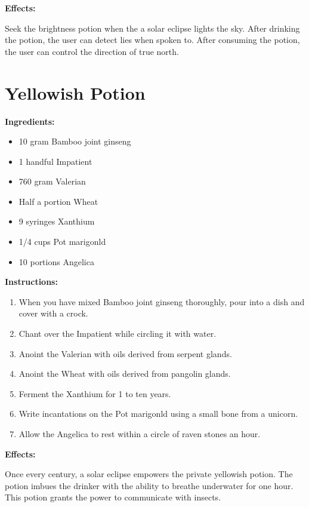 \documentclass{article}
\begin{document}
\textbf{Effects:}

Seek the brightness potion when the a solar eclipse lights the sky. After drinking the potion, the user can detect lies when spoken to. After consuming the potion, the user can control the direction of true north.

\newpage
\section*{Yellowish Potion}

\textbf{Ingredients:}

\begin{itemize}
  \item 10 gram Bamboo joint ginseng
  \item 1 handful Impatient
  \item 760 gram Valerian
  \item Half a portion Wheat
  \item 9 syringes Xanthium
  \item 1/4 cups Pot marigonld
  \item 10 portions Angelica
\end{itemize}

\textbf{Instructions:}

\begin{enumerate}
  \item When you have mixed Bamboo joint ginseng thoroughly, pour into a dish and cover with a crock.
  \item Chant over the Impatient while circling it with water.
  \item Anoint the Valerian with oils derived from serpent glands.
  \item Anoint the Wheat with oils derived from pangolin glands.
  \item Ferment the Xanthium for 1 to ten years.
  \item Write incantations on the Pot marigonld using a small bone from a unicorn.
  \item Allow the Angelica to rest within a circle of raven stones an hour.
\end{enumerate}

\textbf{Effects:}

Once every century, a solar eclipse empowers the private yellowish potion. The potion imbues the drinker with the ability to breathe underwater for one hour. This potion grants the power to communicate with insects.
\end{document}
